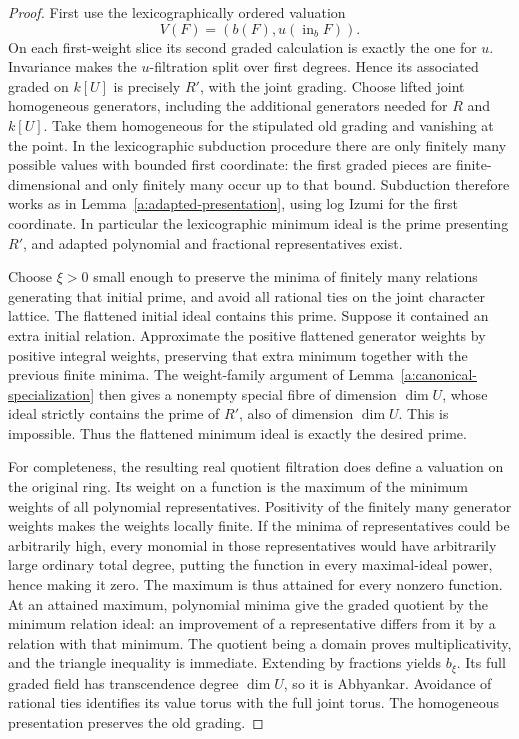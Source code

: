 \begin{proof}
First use the lexicographically ordered valuation
\[
           V(F)=(b(F),u(\operatorname{in}_b F)).
\]
On each first-weight slice its second graded calculation is exactly the
one for \(u\). Invariance makes the \(u\)-filtration split over first
degrees. Hence its associated graded on \(k[U]\) is precisely \(R'\),
with the joint grading. Choose lifted joint homogeneous generators,
including the additional generators needed for \(R\) and \(k[U]\).
Take them homogeneous for the stipulated old grading and vanishing at
the point. In the lexicographic subduction procedure there are only
finitely many possible values with bounded first coordinate: the first
graded pieces are finite-dimensional and only finitely many occur up to
that bound. Subduction therefore works as in
Lemma~\ref{a:adapted-presentation}, using log Izumi for the first
coordinate. In particular the lexicographic minimum ideal is the prime
presenting \(R'\), and adapted polynomial and fractional representatives
exist.

Choose \(\xi>0\) small enough to preserve the minima of finitely many
relations generating that initial prime, and avoid all rational ties on
the joint character lattice. The flattened initial ideal contains this
prime. Suppose it contained an extra initial relation. Approximate the
positive flattened generator weights by positive integral weights,
preserving that extra minimum together with the previous finite minima.
The weight-family argument of Lemma~\ref{a:canonical-specialization}
then gives a nonempty special fibre of dimension \(\dim U\), whose
ideal strictly contains the prime of \(R'\), also of dimension
\(\dim U\). This is impossible. Thus the flattened minimum ideal is
exactly the desired prime.

For completeness, the resulting real quotient filtration does define a
valuation on the original ring. Its weight on a function is the maximum
of the minimum weights of all polynomial representatives. Positivity
of the finitely many generator weights makes the weights locally finite.
If the minima of representatives could be arbitrarily high, every
monomial in those representatives would have arbitrarily large ordinary
total degree, putting the function in every maximal-ideal power, hence
making it zero. The maximum is thus
attained for every nonzero function. At an attained maximum, polynomial
minima give the graded quotient by the minimum relation ideal: an
improvement of a representative differs from it by a relation with that
minimum. The quotient being a domain proves multiplicativity, and the
triangle inequality is immediate. Extending by fractions yields
\(b_\xi\). Its full graded field has transcendence degree \(\dim U\),
so it is Abhyankar. Avoidance of rational ties identifies its value
torus with the full joint torus. The homogeneous presentation preserves
the old grading.


\end{proof}
